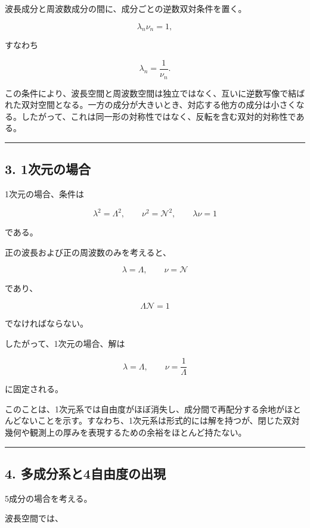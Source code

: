 \documentclass[
]{ltjsarticle}
\begin{document}
波長成分と周波数成分の間に、成分ごとの逆数双対条件を置く。

\[
\lambda_n\nu_n=1,
\]

すなわち

\[
\lambda_n=\frac{1}{\nu_n}.
\]

この条件により、波長空間と周波数空間は独立ではなく、互いに逆数写像で結ばれた双対空間となる。一方の成分が大きいとき、対応する他方の成分は小さくなる。したがって、これは同一形の対称性ではなく、反転を含む双対的対称性である。

\begin{center}\rule{0.5\linewidth}{0.5pt}\end{center}

\subsection{3. 1次元の場合}\label{ux6b21ux5143ux306eux5834ux5408}

1次元の場合、条件は

\[
\lambda^2=\Lambda^2,\qquad
\nu^2=\mathcal{N}^2,\qquad
\lambda\nu=1
\]

である。

正の波長および正の周波数のみを考えると、

\[
\lambda=\Lambda,\qquad
\nu=\mathcal{N}
\]

であり、

\[
\Lambda\mathcal{N}=1
\]

でなければならない。

したがって、1次元の場合、解は

\[
\lambda=\Lambda,\qquad
\nu=\frac{1}{\Lambda}
\]

に固定される。

このことは、1次元系では自由度がほぼ消失し、成分間で再配分する余地がほとんどないことを示す。すなわち、1次元系は形式的には解を持つが、閉じた双対幾何や観測上の厚みを表現するための余裕をほとんど持たない。

\begin{center}\rule{0.5\linewidth}{0.5pt}\end{center}

\subsection{4.
多成分系と4自由度の出現}\label{ux591aux6210ux5206ux7cfbux30684ux81eaux7531ux5ea6ux306eux51faux73fe}

5成分の場合を考える。

波長空間では、
\end{document}
